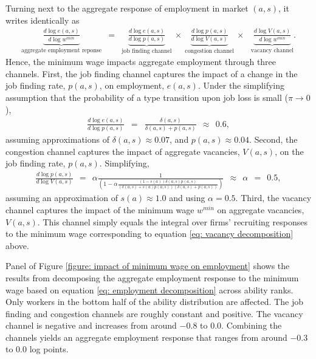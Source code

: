 Turning next to the aggregate response of employment in market $(a,s)$, it writes identically as
\begin{eqnarray}
  \underbrace{ \frac{d \log e(a,s)}{d\log w^{min}} }_{\text{aggregate employment reponse}} &=& \underbrace{\frac{d\log e(a,s)}{d\log p(a,s)}}_{\text{job finding channel}} \ \times \ \underbrace{\frac{d\log p(a,s)}{d\log V(a,s)}}_{\text{congestion channel}} \ \times \ \ \ \underbrace{\frac{d\log V(a,s)}{d\log w^{min}}}_{\text{vacancy channel}}. \label{eq: employment decomposition}
\end{eqnarray}
Hence, the minimum wage impacts aggregate employment through three channels. First, the job finding channel captures the impact of a change in the job finding rate, $p(a,s)$, on employment, $e(a,s)$. Under the simplifying assumption that the probability of a type transition upon job loss is small ($\pi \to 0$),
\begin{eqnarray*}
  \frac{d\log e(a,s)}{d\log p(a,s)} &=& \frac{\delta(a,s)}{\delta(a,s)+p(a,s)} \ \ \approx \ \ 0.6,
\end{eqnarray*}
assuming approximations of $\delta(a,s) \approx 0.07$, and $p(a,s) \approx 0.04$. Second, the congestion channel captures the impact of aggregate vacancies, $V(a,s)$, on the job finding rate, $p(a,s)$. Simplifying,
%
\begin{eqnarray*}
  \frac{d\log p(a,s)}{d\log V(a,s)} \ \ = \ \ \alpha \frac{1}{\left(1-\alpha\frac{(1-s(a))\delta(a,s) p(a,s)}{(\delta(a,s)+s(a)p(a,s))(\delta(a,s)+p(a,s))}\right)} \ \ \approx \ \  \alpha \ \ = \ \ 0.5,
\end{eqnarray*}
%
assuming an approximation of $s(a) \approx 1.0$ and using $\alpha = 0.5$. Third, the vacancy channel captures the impact of the minimum wage $w^{min}$ on aggregate vacancies, $V(a,s)$. This channel simply equals the integral over firms' recruiting responses to the minimum wage corresponding to equation \eqref{eq: vacancy decomposition} above.

Panel  of Figure \ref{figure: impact of minimum wage on employment} shows the results from decomposing the aggregate employment response to the minimum wage based on equation \eqref{eq: employment decomposition} across ability ranks. %
Only workers in the bottom half of the ability distribution are affected. The job finding and congestion channels are roughly constant and positive. The vacancy channel is negative and increases from around $-0.8$ to $0.0$. Combining the channels yields an aggregate employment response that ranges from around $-0.3$ to $0.0$ log points.


